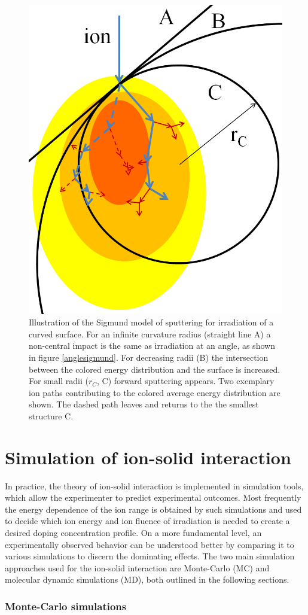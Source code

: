 \begin{figure}
	\centering
		\includegraphics[width=.4\textwidth]{images/radiussigmund.jpg}
	\caption{Illustration of the Sigmund model of sputtering for irradiation of a curved surface. For an infinite curvature radius (straight line A) a non-central impact is the same as irradiation at an angle, as shown in figure \ref{anglesigmund}. For decreasing radii (B) the intersection between the colored energy distribution and the surface is increased. For small radii ($r_C$, C) forward sputtering appears. Two exemplary ion paths contributing to the colored average energy distribution are shown. The dashed path leaves and returns to the the smallest structure C.}
	\label{radiussigmund}
\end{figure} 


\section{Simulation of ion-solid interaction}
\label{sec:simion}

In practice, the theory of ion-solid interaction is implemented in simulation tools, which allow the experimenter to predict experimental outcomes. Most frequently the energy dependence of the ion range is obtained by such simulations and used to decide which ion energy and ion fluence of irradiation is needed to create a desired doping concentration profile. On a more fundamental level, an experimentally observed behavior can be understood better by comparing it to various simulations to discern the dominating effects. The two main simulation approaches used for the ion-solid interaction are Monte-Carlo (MC) and molecular dynamic simulations (MD), both outlined in the following sections.


\subsubsection{Monte-Carlo simulations}


